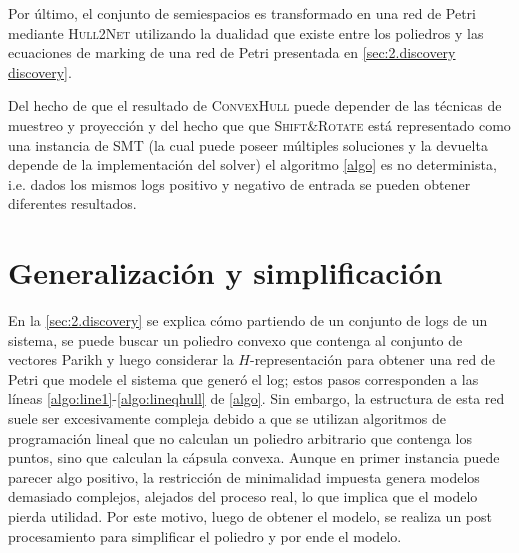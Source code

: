 Por último, el conjunto de semiespacios es transformado en una red de Petri mediante \textsc{Hull2Net} utilizando
la dualidad que existe entre los poliedros y las ecuaciones de marking de una red de Petri
presentada en \autoref{sec:2.discovery discovery}.

Del hecho de que el resultado de \textsc{ConvexHull} puede depender de las técnicas de muestreo y proyección y del
hecho que que \textsc{Shift\&Rotate} está representado como una instancia de SMT (la cual puede poseer múltiples soluciones
y la devuelta depende de la implementación del solver) el algoritmo \autoref{algo} es no determinista, i.e. dados
los mismos logs positivo y negativo de entrada se pueden obtener diferentes resultados.

    
\section{Generalización y simplificación}
\label{sec:3.gensimp}

En la \autoref{sec:2.discovery} se explica cómo partiendo de un conjunto de logs de un sistema, se puede
buscar un poliedro convexo que contenga al conjunto de vectores Parikh y luego considerar la $H$-representación para
obtener una red de Petri que modele el sistema que generó el log; estos pasos corresponden
a las líneas \ref{algo:line1}-\ref{algo:lineqhull} de \autoref{algo}.
Sin embargo, la estructura de esta red suele ser excesivamente compleja debido a que se utilizan 
algoritmos de programación lineal que no calculan un poliedro arbitrario que contenga los puntos,
sino que calculan la cápsula convexa. Aunque en primer instancia puede parecer algo positivo, la restricción
de minimalidad impuesta genera modelos demasiado complejos, alejados del proceso real, lo que
implica que el modelo pierda utilidad. Por este motivo, luego de obtener el modelo, se realiza un post
procesamiento para simplificar el poliedro y por ende el modelo.

